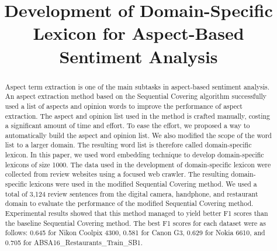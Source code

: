 \documentclass[a4paper,conference]{IEEEtran}
\begin{document}
\title{Development of Domain-Specific Lexicon for Aspect-Based Sentiment Analysis\\
}

\author{
}

\author{
}

\IEEEoverridecommandlockouts
{}

\maketitle

\begin{abstract}
Aspect term extraction is one of the main subtasks in aspect-based sentiment analysis. An aspect extraction method based on the Sequential Covering algorithm \cite{b2} successfully used a list of aspects and opinion words to improve the performance of aspect extraction. The aspect and opinion list used in the method is crafted manually, costing a significant amount of time and effort. To ease the effort, we proposed a way to automatically build the aspect and opinion list. We also modified the scope of the word list to a larger domain. The resulting word list is therefore called domain-specific lexicon. In this paper, we used word embedding technique to develop domain-specific lexicons of size 1000. The data used in the development of domain-specific lexicon were collected from review websites using a focused web crawler. The resulting domain-specific lexicons were used in the modified Sequential Covering method. We used a total of 3,124 review sentences from the digital camera, handphone, and restaurant domain to evaluate the performance of the modified Sequential Covering method. Experimental results showed that this method managed to yield better F1 scores than the baseline Sequential Covering method. The best F1 scores for each dataset were as follows: 0.645 for Nikon Coolpix 4300, 0.581 for Canon G3, 0.629 for Nokia 6610, and 0.705 for ABSA16\_Restaurants\_Train\_SB1.
\end{abstract}
\end{document}
